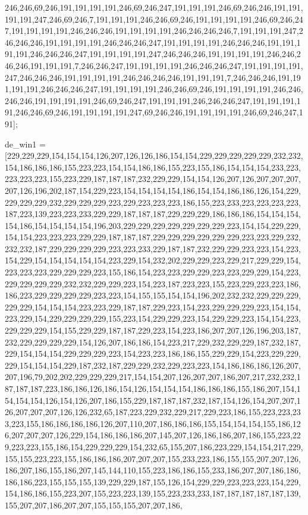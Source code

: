 246,246,69,246,191,191,191,191,246,69,246,247,191,191,191,246,69,246,246,191,191,191,191,247,246,69,246,7,191,191,191,246,246,69,246,191,191,191,191,246,69,246,247,191,191,191,191,246,246,246,191,191,191,191,246,246,246,246,7,191,191,191,247,246,246,246,191,191,191,191,246,246,246,247,191,191,191,191,246,246,246,191,191,191,191,246,246,246,247,191,191,191,191,247,246,246,246,191,191,191,191,246,246,246,246,191,191,191,7,246,246,247,191,191,191,191,246,246,246,247,191,191,191,191,247,246,246,246,191,191,191,191,246,246,246,246,191,191,191,7,246,246,246,191,191,191,191,246,246,246,247,191,191,191,191,246,246,69,246,191,191,191,191,246,246,246,246,191,191,191,191,246,69,246,247,191,191,191,246,246,246,247,191,191,191,191,246,246,69,246,191,191,191,191,247,69,246,246,191,191,191,191,246,69,246,247,191];

de_win1 = [229,229,229,154,154,154,126,207,126,126,186,154,154,229,229,229,229,229,232,232,154,186,186,186,155,223,223,154,154,186,186,155,223,155,186,154,154,154,233,223,223,223,223,155,223,229,187,187,187,232,229,229,154,154,126,207,126,207,207,207,207,126,196,202,187,154,229,223,154,154,154,154,186,154,154,186,186,126,154,229,229,229,229,232,229,229,229,223,229,223,223,223,186,155,223,233,223,223,223,223,187,223,139,223,223,233,229,229,187,187,187,229,229,229,186,186,186,154,154,154,154,186,154,154,154,154,196,203,229,229,229,229,229,229,229,223,154,154,229,229,154,154,223,223,223,229,229,187,187,187,229,229,229,229,229,229,223,223,229,232,232,232,187,229,229,229,229,223,223,233,229,187,187,232,229,229,223,223,154,223,154,229,154,154,154,154,154,223,229,154,232,202,229,229,223,229,217,229,229,154,223,223,223,229,229,229,223,155,186,154,223,223,229,229,223,223,229,229,154,223,229,229,229,229,232,232,229,229,223,154,223,187,223,223,155,223,229,223,223,186,186,223,229,229,229,229,223,223,154,155,155,154,154,196,202,232,232,229,229,229,229,229,154,154,154,223,223,229,187,187,229,223,154,223,229,229,229,223,154,154,223,229,154,229,229,229,229,155,223,154,229,229,223,154,229,229,223,154,154,223,229,229,229,154,155,229,229,187,187,229,223,154,223,186,207,207,126,196,203,187,232,229,229,229,229,154,126,207,186,186,154,223,217,229,232,229,229,187,232,187,229,154,154,154,229,229,229,223,154,223,223,186,186,155,229,229,154,223,229,229,229,154,154,154,229,187,232,187,229,229,232,229,223,223,154,186,186,186,126,207,207,196,79,202,202,229,229,229,217,154,154,207,126,207,207,186,207,217,232,232,187,187,187,223,186,186,126,186,154,126,154,154,154,186,186,186,155,186,207,154,154,154,154,126,154,126,207,186,155,229,187,187,187,232,187,154,126,154,207,207,126,207,207,207,126,126,232,65,187,223,229,232,229,217,229,223,186,155,223,223,233,223,155,186,186,186,186,126,207,110,207,186,186,186,155,154,154,154,155,186,126,207,207,207,126,229,154,186,186,186,207,145,207,126,186,186,207,186,155,223,229,223,223,155,186,154,229,229,229,154,232,65,155,207,186,223,229,154,154,217,229,155,155,223,223,155,186,186,186,207,207,207,155,233,223,186,155,155,207,207,126,186,207,186,155,186,207,145,144,110,155,223,186,186,155,233,186,207,207,186,186,186,186,223,155,155,155,139,229,229,187,155,126,154,229,229,223,223,223,154,229,154,186,186,155,223,207,155,223,223,139,155,223,233,233,187,187,187,187,187,139,155,207,207,186,207,207,155,155,155,207,207,186,